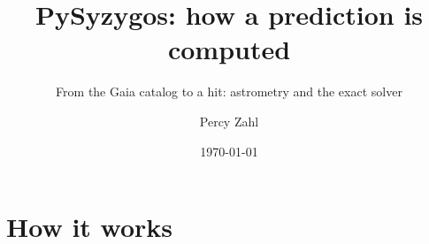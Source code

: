 \documentclass[aspectratio=169,11pt]{beamer}
\title{PySyzygos: how a prediction is computed}
\subtitle{From the Gaia catalog to a hit: astrometry and the exact solver}
\author{Percy Zahl}
\institute{\faGithub\ \href{https://github.com/pyzahl/PySyzygos}{github.com/pyzahl/PySyzygos}\\[0.3ex]
  For PySyzygos version \pyversion\ \textit{``\pycodename''}}
\date{\today}
\begin{document}
\maketitle

\section{How it works}


\appendix
{}
\end{document}

